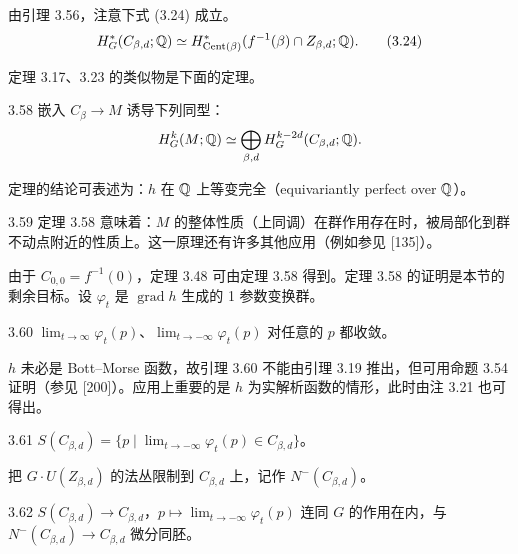 
由引理 3.56，注意下式 (3.24) 成立。
\begin{equation}
  H^*_G(C_{\beta,d};\mathbb{Q})\simeq H^*_{\operatorname{Cent}(\beta)}(f^{-1}(\beta)\cap Z_{\beta,d};\mathbb{Q}). \tag{3.24}
\end{equation}

定理 3.17、3.23 的类似物是下面的定理。

\begin{theorem}{3.58}
  嵌入 $C_\beta\to M$ 诱导下列同型：
  \[
    H^k_G(M;\mathbb{Q})\simeq\bigoplus_{\beta,d}H^{k-2d}_G(C_{\beta,d};\mathbb{Q}).
  \]
\end{theorem}

定理的结论可表述为：$h$ 在 $\mathbb{Q}$ 上等变完全（equivariantly perfect over $\mathbb{Q}$）。

\begin{remark}{3.59}
  定理 3.58 意味着：$M$ 的整体性质（上同调）在群作用存在时，被局部化到群不动点附近的性质上。这一原理还有许多其他应用（例如参见 [135]）。
\end{remark}

由于 $C_{0,0}=f^{-1}(0)$，定理 3.48 可由定理 3.58 得到。定理 3.58 的证明是本节的剩余目标。设 $\varphi_t$ 是 $\operatorname{grad}h$ 生成的 1 参数变换群。

\begin{lemma}{3.60}
  $\lim_{t\to\infty}\varphi_t(p)$、$\lim_{t\to-\infty}\varphi_t(p)$ 对任意的 $p$ 都收敛。
\end{lemma}

$h$ 未必是 Bott–Morse 函数，故引理 3.60 不能由引理 3.19 推出，但可用命题 3.54 证明（参见 [200]）。应用上重要的是 $h$ 为实解析函数的情形，此时由注 3.21 也可得出。

\begin{definition}{3.61}
  $S(C_{\beta,d})=\{p\mid \lim_{t\to-\infty}\varphi_t(p)\in C_{\beta,d}\}$。
\end{definition}

把 $G\cdot U(Z_{\beta,d})$ 的法丛限制到 $C_{\beta,d}$ 上，记作 $N^-(C_{\beta,d})$。

\begin{lemma}{3.62}
  $S(C_{\beta,d})\to C_{\beta,d}$，$p\mapsto\lim_{t\to-\infty}\varphi_t(p)$ 连同 $G$ 的作用在内，与 $N^-(C_{\beta,d})\to C_{\beta,d}$ 微分同胚。
\end{lemma}

